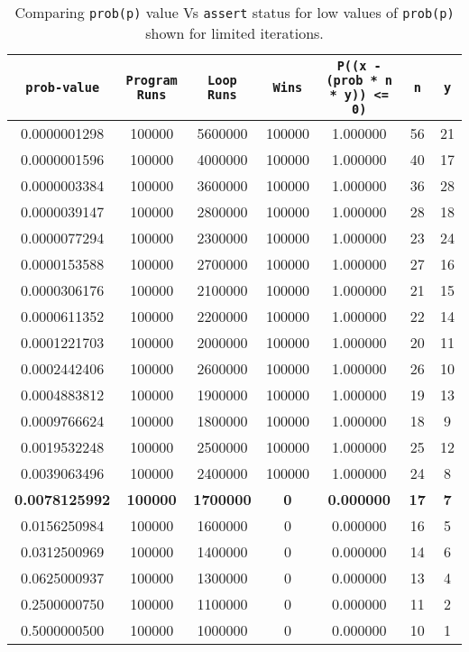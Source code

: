 \documentclass[usenames,dvipsnames,acmsmall]{acmart}
\begin{document}
	\begin{table}
		\centering
		\caption{Comparing \texttt{prob(p)} value Vs \texttt{assert} status for low values of \texttt{prob(p)} shown for limited iterations.}
		\label{}
		\begin{tabular}{ c | c | c | c | c | c | c } 
			\toprule
			\texttt{prob-value} & \texttt{Program Runs}& \texttt{Loop Runs} & \texttt{Wins} & \texttt{P((x - (prob * n * y)) <= 0)}  & \texttt{n} & \texttt{y} \\ 
			\hline\hline
			0.0000001298 & 100000 & 5600000 & 100000 & 1.000000 & 56 & 21 \\ \hline
			0.0000001596 & 100000 & 4000000 & 100000 & 1.000000 & 40 & 17 \\ \hline
			0.0000003384 & 100000 & 3600000 & 100000 & 1.000000 & 36 & 28 \\ \hline
			0.0000039147 & 100000 & 2800000 & 100000 & 1.000000 & 28 & 18 \\ \hline
			0.0000077294 & 100000 & 2300000 & 100000 & 1.000000 & 23 & 24 \\ \hline
			0.0000153588 & 100000 & 2700000 & 100000 & 1.000000 & 27 & 16 \\ \hline
			0.0000306176 & 100000 & 2100000 & 100000 & 1.000000 & 21 & 15 \\ \hline
			0.0000611352 & 100000 & 2200000 & 100000 & 1.000000 & 22 & 14 \\ \hline
			0.0001221703 & 100000 & 2000000 & 100000 & 1.000000 & 20 & 11 \\ \hline
			0.0002442406 & 100000 & 2600000 & 100000 & 1.000000 & 26 & 10 \\ \hline
			0.0004883812 & 100000 & 1900000 & 100000 & 1.000000 & 19 & 13 \\ \hline
			0.0009766624 & 100000 & 1800000 & 100000 & 1.000000 & 18 & 9 \\ \hline
			0.0019532248 & 100000 & 2500000 & 100000 & 1.000000 & 25 & 12 \\ \hline
			0.0039063496 & 100000 & 2400000 & 100000 & 1.000000 & 24 & 8 \\ \hline
			{\textbf{ \color[HTML]{036400} 0.0078125992}} & {\textbf{\color[HTML]{036400} 100000}} & {\textbf{\color[HTML]{036400} 1700000}} & {\textbf{\color[HTML]{036400} 0}} & {\textbf{\color[HTML]{036400} 0.000000}} & {\textbf{\color[HTML]{036400} 17}} & {\textbf{\color[HTML]{036400} 7}} \\ \hline
			0.0156250984 & 100000 & 1600000 & 0 & 0.000000 & 16 & 5 \\ \hline
			0.0312500969 & 100000 & 1400000 & 0 & 0.000000 & 14 & 6 \\ \hline
			0.0625000937 & 100000 & 1300000 & 0 & 0.000000 & 13 & 4 \\ \hline
			0.2500000750 & 100000 & 1100000 & 0 & 0.000000 & 11 & 2 \\ \hline
			0.5000000500 & 100000 & 1000000 & 0 & 0.000000 & 10 & 1 \\ \hline
			\bottomrule
		\end{tabular}
	\end{table}
\end{document}
